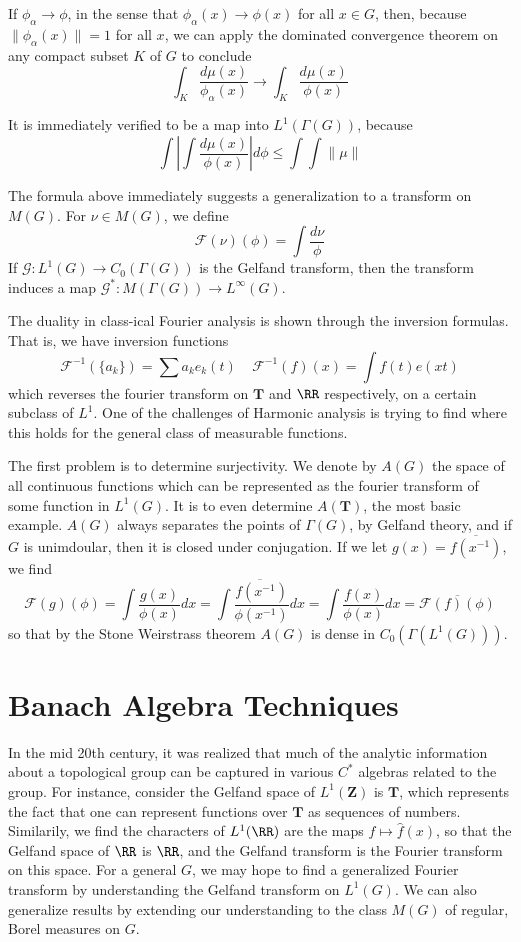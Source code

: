 If $\phi_\alpha \to \phi$, in the sense that $\phi_\alpha(x) \to \phi(x)$ for all $x \in G$, then, because $\| \phi_\alpha(x) \| = 1$ for all $x$, we can apply the dominated convergence theorem on any compact subset $K$ of $G$ to conclude
%
\[ \int_K \frac{d\mu(x)}{\phi_\alpha(x)} \to \int_K \frac{d\mu(x)}{\phi(x)} \]

It is immediately verified to be a map into $L^1(\Gamma(G))$, because
%
\[ \int \left| \int \frac{d\mu(x)}{\phi(x)} \right| d\phi \leq \int \int \| \mu \| \]

The formula above immediately suggests a generalization to a transform on $M(G)$. For $\nu \in M(G)$, we define
%
\[ \mathcal{F}(\nu)(\phi) = \int \frac{d \nu}{\phi} \]
%
If $\mathcal{G}: L^1(G) \to C_0(\Gamma(G))$ is the Gelfand transform, then the transform induces a map $\mathcal{G}^* : M(\Gamma(G)) \to L^\infty(G)$.

The duality in class-ical Fourier analysis is shown through the inversion formulas. That is, we have inversion functions
\[ \mathcal{F}^{-1}(\{ a_k \}) = \sum a_k e_k(t)\ \ \ \ \ \mathcal{F}^{-1}(f)(x) = \int f(t) e(x t) \]
%
which reverses the fourier transform on $\mathbf{T}$ and $\RR$ respectively, on a certain subclass of $L^1$. One of the challenges of Harmonic analysis is trying to find where this holds for the general class of measurable functions.

The first problem is to determine surjectivity. We denote by $A(G)$ the space of all continuous functions which can be represented as the fourier transform of some function in $L^1(G)$. It is to even determine $A(\mathbf{T})$, the most basic example. $A(G)$ always separates the points of $\Gamma(G)$, by Gelfand theory, and if $G$ is unimdoular, then it is closed under conjugation. If we let $g(x) = \overline{f(x^{-1})}$, we find
%
\[ \mathcal{F}(g)(\phi) = \int \frac{g(x)}{\phi(x)} dx = \overline{ \int \frac{f(x^{-1})}{\phi(x^{-1})} dx } = \int \frac{f(x)}{\phi(x)} dx = \overline{\mathcal{F}(f)(\phi)} \]
%
so that by the Stone Weirstrass theorem $A(G)$ is dense in $C_0(\Gamma(L^1(G)))$.

\chapter{Banach Algebra Techniques}

In the mid 20th century, it was realized that much of the analytic information about a topological group can be captured in various $C^*$ algebras related to the group. For instance, consider the Gelfand space of $L^1(\mathbf{Z})$ is $\mathbf{T}$, which represents the fact that one can represent functions over $\mathbf{T}$ as sequences of numbers. Similarily, we find the characters of $L^1(\RR)$ are the maps $f \mapsto \widehat{f}(x)$, so that the Gelfand space of $\RR$ is $\RR$, and the Gelfand transform is the Fourier transform on this space. For a general $G$, we may hope to find a generalized Fourier transform by understanding the Gelfand transform on $L^1(G)$. We can also generalize results by extending our understanding to the class $M(G)$ of regular, Borel measures on $G$.


